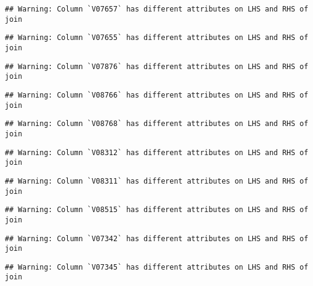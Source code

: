 \documentclass[]{article}
\begin{document}
\begin{verbatim}
## Warning: Column `V07657` has different attributes on LHS and RHS of join
\end{verbatim}

\begin{verbatim}
## Warning: Column `V07655` has different attributes on LHS and RHS of join
\end{verbatim}

\begin{verbatim}
## Warning: Column `V07876` has different attributes on LHS and RHS of join
\end{verbatim}

\begin{verbatim}
## Warning: Column `V08766` has different attributes on LHS and RHS of join
\end{verbatim}

\begin{verbatim}
## Warning: Column `V08768` has different attributes on LHS and RHS of join
\end{verbatim}

\begin{verbatim}
## Warning: Column `V08312` has different attributes on LHS and RHS of join
\end{verbatim}

\begin{verbatim}
## Warning: Column `V08311` has different attributes on LHS and RHS of join
\end{verbatim}

\begin{verbatim}
## Warning: Column `V08515` has different attributes on LHS and RHS of join
\end{verbatim}

\begin{verbatim}
## Warning: Column `V07342` has different attributes on LHS and RHS of join
\end{verbatim}

\begin{verbatim}
## Warning: Column `V07345` has different attributes on LHS and RHS of join
\end{verbatim}
\end{document}

